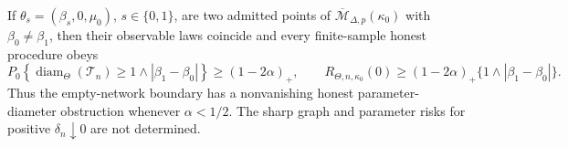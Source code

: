 If \(\theta_s=(\beta_s,0,\mu_0)\), \(s\in\{0,1\}\), are two admitted points of \(\overline{\mathcal M}_{\Delta,p}(\kappa_0)\) with \(\beta_0\neq\beta_1\), then their observable laws coincide and every finite-sample honest procedure obeys
\[
 P_0\!\left\{\operatorname{diam}_{\Theta}(\mathcal T_n)\geq1\wedge|\beta_1-\beta_0|\right\}\geq(1-2\alpha)_+,
 \qquad
 R_{\Theta,n,\kappa_0}(0)\geq(1-2\alpha)_+\{1\wedge|\beta_1-\beta_0|\}.
\]
Thus the empty-network boundary has a nonvanishing honest parameter-diameter obstruction whenever \(\alpha<1/2\). The sharp graph and parameter risks for positive \(\delta_n\downarrow0\) are not determined.
